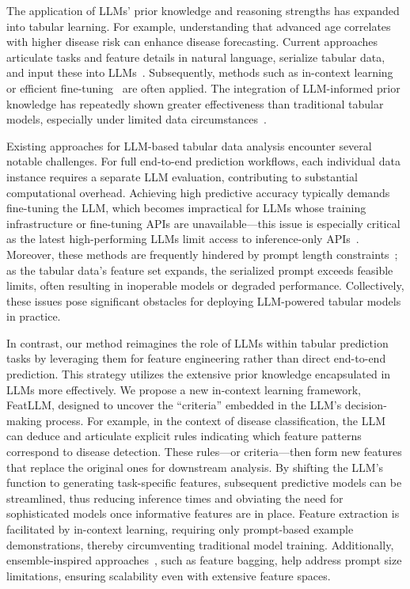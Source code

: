 The application of LLMs' prior knowledge and reasoning strengths has expanded into tabular learning. For example, understanding that advanced age correlates with higher disease risk can enhance disease forecasting. Current approaches articulate tasks and feature details in natural language, serialize tabular data, and input these into LLMs~\cite{dinh2022lift,wang2023anypredict}. Subsequently, methods such as in-context learning~\cite{nam2023semi} or efficient fine-tuning~\cite{dinh2022lift,hegselmann2023tabllm} are often applied. The integration of LLM-informed prior knowledge has repeatedly shown greater effectiveness than traditional tabular models, especially under limited data circumstances~\cite{hegselmann2023tabllm}.

Existing approaches for LLM-based tabular data analysis encounter several notable challenges. For full end-to-end prediction workflows, each individual data instance requires a separate LLM evaluation, contributing to substantial computational overhead. Achieving high predictive accuracy typically demands fine-tuning the LLM, which becomes impractical for LLMs whose training infrastructure or fine-tuning APIs are unavailable—this issue is especially critical as the latest high-performing LLMs limit access to inference-only APIs~\cite{anil2023palm,openai2023gpt4}. Moreover, these methods are frequently hindered by prompt length constraints~\cite{liu2023lost}; as the tabular data's feature set expands, the serialized prompt exceeds feasible limits, often resulting in inoperable models or degraded performance. Collectively, these issues pose significant obstacles for deploying LLM-powered tabular models in practice.

In contrast, our method reimagines the role of LLMs within tabular prediction tasks by leveraging them for feature engineering rather than direct end-to-end prediction. This strategy utilizes the extensive prior knowledge encapsulated in LLMs more effectively. We propose a new in-context learning framework, \textsf{FeatLLM}, designed to uncover the ``criteria'' embedded in the LLM's decision-making process. For example, in the context of disease classification, the LLM can deduce and articulate explicit rules indicating which feature patterns correspond to disease detection. These rules—or criteria—then form new features that replace the original ones for downstream analysis. By shifting the LLM's function to generating task-specific features, subsequent predictive models can be streamlined, thus reducing inference times and obviating the need for sophisticated models once informative features are in place. Feature extraction is facilitated by in-context learning, requiring only prompt-based example demonstrations, thereby circumventing traditional model training. Additionally, ensemble-inspired approaches~\cite{breiman2001random}, such as feature bagging, help address prompt size limitations, ensuring scalability even with extensive feature spaces.

